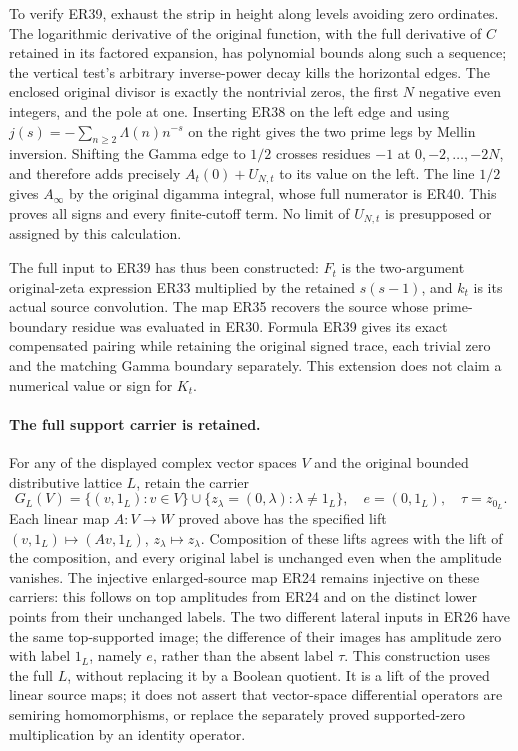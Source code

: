 To verify ER39, exhaust the strip in height along levels avoiding
zero ordinates. The logarithmic derivative of the original function,
with the full derivative of \(C\) retained in its factored expansion,
has polynomial bounds along such a sequence; the vertical test's
arbitrary inverse-power decay kills the horizontal edges. The
enclosed original divisor is exactly the nontrivial zeros, the
first \(N\) negative even integers, and the pole at one.
Inserting ER38 on the left edge and using
\(j(s)=-\sum_{n\ge2}\Lambda(n)n^{-s}\) on the right gives
the two prime legs by Mellin inversion. Shifting the Gamma
edge to \(1/2\) crosses residues \(-1\) at
\(0,-2,\ldots,-2N\), and therefore adds precisely
\(A_t(0)+U_{N,t}\) to its value on the left.
The line \(1/2\) gives \(A_\infty\) by the original digamma
integral, whose full numerator is ER40. This proves all signs
and every finite-cutoff term. No limit of \(U_{N,t}\) is
presupposed or assigned by this calculation.

The full input to ER39 has thus been constructed: \(F_t\) is the
two-argument original-zeta expression ER33 multiplied by the
retained \(s(s-1)\), and \(k_t\) is its actual source convolution.
The map ER35 recovers the source whose prime-boundary residue
was evaluated in ER30. Formula ER39 gives its exact compensated
pairing while retaining the original signed trace, each trivial
zero and the matching Gamma boundary separately. This extension
does not claim a numerical value or sign for \(K_t\).

\paragraph{The full support carrier is retained.}
For any of the displayed complex vector spaces \(V\) and the
original bounded distributive lattice \(L\), retain the carrier
\[
 G_L(V)=\{(v,1_L):v\in V\}
       \cup\{z_\lambda=(0,\lambda):\lambda\ne1_L\},
 \quad e=(0,1_L),\quad\tau=z_{0_L}.
 \tag{ER40a}
\]
Each linear map \(A:V\to W\) proved above has the specified lift
\((v,1_L)\mapsto(Av,1_L)\), \(z_\lambda\mapsto z_\lambda\).
Composition of these lifts agrees with the lift of the composition,
and every original label is unchanged even when the amplitude
vanishes. The injective enlarged-source map ER24 remains injective
on these carriers: this follows on top amplitudes from ER24 and
on the distinct lower points from their unchanged labels.
The two different lateral inputs in ER26 have the same top-supported
image; the difference of their images has amplitude zero with label \(1_L\),
namely \(e\), rather than the absent label \(\tau\).
This construction uses the full \(L\), without replacing it by
a Boolean quotient. It is a lift of the proved linear source maps;
it does not assert that vector-space differential operators are
semiring homomorphisms, or replace the separately proved
supported-zero multiplication by an identity operator.

